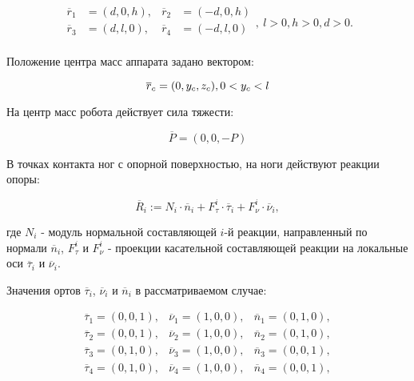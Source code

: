 \begin{equation}
  \label{articulated:case_1_step_points}
  \begin{alignedat}{3}
    \overline{r}_1 &= (d, 0, h) , &\overline{r}_2 &= (-d, 0, h) \\
    \overline{r}_3 &= (d, l, 0) , &\overline{r}_4 &= (-d, l, 0) \\
  \end{alignedat},~l>0, h>0, d>0.
\end{equation}


Положение центра масс аппарата задано вектором:


\begin{equation}
\label{articulated:case_1_center_of_gravity}
  \overline{r}_c = (0, y_c, z_c), 0 < y_c < l\\
\end{equation}


На центр масс робота действует сила тяжести:

\begin{equation}
\label{eq:F_c}
  \overline{P} = (0,0,-P)
\end{equation}

В точках контакта ног с опорной поверхностью, на ноги действуют реакции опоры:

\begin{equation}
\label{eq:reactions}
  \overline{R}_i := N_i\cdot\overline{n}_i + F_\tau^i\cdot\overline{\tau}_i + F_\nu^i\cdot\overline{\nu}_i,
\end{equation}

где $N_i$ - модуль нормальной составляющей $i$-й реакции, направленный по нормали $\overline{n}_i$, $F_\tau^i$ и $F_\nu^i$ - проекции касательной составляющей реакции на локальные оси $\overline{\tau}_i$ и $\overline{\nu}_i$.

Значения ортов $\overline{\tau}_i$, $\overline{\nu}_i$ и $\overline{n}_i$ в рассматриваемом случае:

\begin{equation}
\label{articulated:case_1_orts}
  \begin{alignedat}{3}
    \overline{\tau}_1 = (0,0,1),&\overline{\nu}_1 = (1,0,0),&\overline{n}_1 = (0,1,0),\\
    \overline{\tau}_2 = (0,0,1),&\overline{\nu}_2 = (1,0,0),&\overline{n}_2 = (0,1,0),\\
    \overline{\tau}_3 = (0,1,0),&\overline{\nu}_3 = (1,0,0),&\overline{n}_3 = (0,0,1),\\
    \overline{\tau}_4 = (0,1,0),&\overline{\nu}_4 = (1,0,0),&\overline{n}_4 = (0,0,1),\\
  \end{alignedat}
\end{equation}


